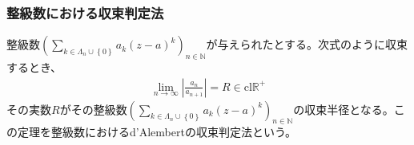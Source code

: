 \documentclass[dvipdfmx]{jsarticle}
\begin{document}
\subsubsection{整級数における収束判定法}%
\begin{thm}\label{4.1.13.8}
整級数$\left( \sum_{k \in \varLambda_{n} \cup \left\{ 0 \right\}} {a_{k}(z - a)^{k}} \right)_{n \in \mathbb{N}}$が与えられたとする。次式のように収束するとき、
\begin{align*}
\lim_{n \rightarrow \infty}\left| \frac{a_{n}}{a_{n + 1}} \right| = R \in \mathrm{cl}\mathbb{R}^{+}
\end{align*}
その実数$R$がその整級数$\left( \sum_{k \in \varLambda_{n} \cup \left\{ 0 \right\}} {a_{k}(z - a)^{k}} \right)_{n \in \mathbb{N}}$の収束半径となる。この定理を整級数におけるd'Alembertの収束判定法という。
\end{thm}
\end{document}

